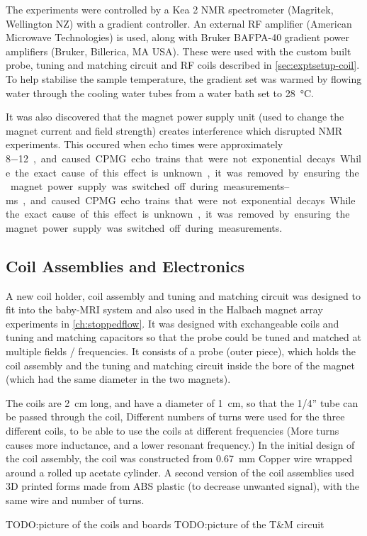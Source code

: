 The experiments were controlled by a Kea 2 NMR spectrometer (Magritek, Wellington NZ) with a gradient controller.
An external RF amplifier (American Microwave Technologies) is used, along with Bruker BAFPA-40 gradient power amplifiers (Bruker, Billerica, MA USA).
These were used with the custom built probe, tuning and matching circuit and RF coils described in \autoref{sec:exptsetup-coil}.
To help stabilise the sample temperature, the gradient set was warmed by flowing water through the cooling water tubes from a water bath set to \SI{28}{\celsius}.

It was also discovered that the magnet power supply unit (used to change the magnet current and field strength) creates interference which disrupted NMR experiments.
This occured when echo times were approximately \SIrange{8-12}{ms}, and caused CPMG echo trains that were not exponential decays.
While the exact cause of this effect is unknown, it was removed by ensuring the magnet power supply was switched off during measurements.

\subsection{Coil Assemblies and Electronics}
\label{sec:exptsetup-coil}
A new coil holder, coil assembly and tuning and matching circuit was designed to fit into the baby-MRI system and also used in the Halbach magnet array experiments in  \autoref{ch:stoppedflow}.
It was designed with exchangeable coils and tuning and matching capacitors so that the probe could be tuned and matched at multiple fields / frequencies.
It consists of a probe (outer piece), which holds the coil assembly and the tuning and matching circuit inside the bore of the magnet (which had the same diameter in the two magnets).

The coils are \SI{2}{cm} long, and have a diameter of \SI{1}{cm}, so that the 1/4'' tube can be passed through the coil,
Different numbers of turns were used for the three different coils, to be able to use the coils at different frequencies (More turns causes more inductance, and a lower resonant frequency.)
In the initial design of the coil assembly, the coil was constructed from \SI{0.67}{mm} Copper wire wrapped around a rolled up acetate cylinder.
A second version of the coil assemblies used 3D printed forms made from ABS plastic (to decrease unwanted signal), with the same wire and number of turns.

TODO:picture of the coils and boards
TODO:picture of the T\&M circuit

